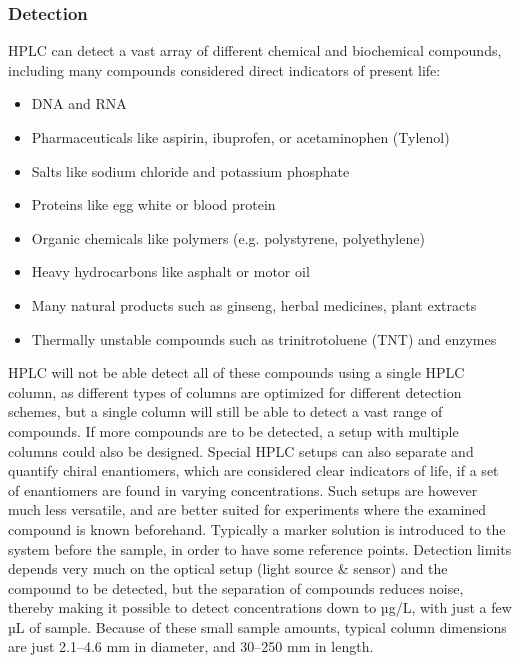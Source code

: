 \subsubsection{Detection}
HPLC can detect a vast array of different chemical and biochemical compounds, including many compounds considered direct indicators of present life:
\begin{itemize}
    \item DNA and RNA
    \item Pharmaceuticals like aspirin, ibuprofen, or acetaminophen (Tylenol) 
    \item Salts like sodium chloride and potassium phosphate 
    \item Proteins like egg white or blood protein 
    \item Organic chemicals like polymers (e.g. polystyrene, polyethylene) 
    \item Heavy hydrocarbons like asphalt or motor oil 
    \item Many natural products such as ginseng, herbal medicines, plant extracts 
    \item Thermally unstable compounds such as trinitrotoluene (TNT) and enzymes 
\end{itemize}
HPLC will not be able detect all of these compounds using a single HPLC column, as different types of columns are optimized for different detection schemes, but a single column will still be able to detect a vast range of compounds. If more compounds are to be detected, a setup with multiple columns could also be designed. Special HPLC setups can also separate and quantify chiral enantiomers, which are considered clear indicators of life, if a set of enantiomers are found in varying concentrations. Such setups are however much less versatile, and are better suited for experiments where the examined compound is known beforehand.
Typically a marker solution is introduced to the system before the sample, in order to have some reference points. Detection limits depends very much on the optical setup (light source \& sensor) and the compound to be detected, but the separation of compounds reduces noise, thereby making it possible to detect concentrations down to µg/L, with just a few µL of sample. Because of these small sample amounts, typical column dimensions are just 2.1–4.6 mm in diameter, and 30–250 mm in length.

